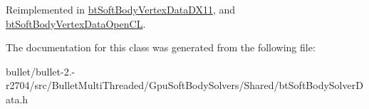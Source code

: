 Reimplemented in \hyperlink{classbt_soft_body_vertex_data_d_x11_a735a87a0a4acc856b2f656bf684852e4}{bt\+Soft\+Body\+Vertex\+Data\+D\+X11}, and \hyperlink{classbt_soft_body_vertex_data_open_c_l_a0277617dbd360ea14ec7848f85b69f4c}{bt\+Soft\+Body\+Vertex\+Data\+Open\+C\+L}.



The documentation for this class was generated from the following file\+:\begin{DoxyCompactItemize}
\item 
bullet/bullet-\/2.-\/r2704/src/\+Bullet\+Multi\+Threaded/\+Gpu\+Soft\+Body\+Solvers/\+Shared/bt\+Soft\+Body\+Solver\+Data.\+h\end{DoxyCompactItemize}
